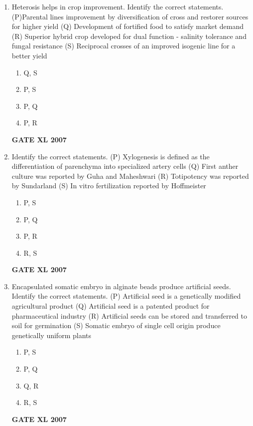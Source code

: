 \documentclass[journal,12pt,onecolumn]{IEEEtran}
\begin{document}
\begin{enumerate}
    \item Heterosis helps in crop improvement. Identify the correct statements.
		    (P)Parental lines improvement by diversification of cross and restorer sources for higher yield
		(Q) Development of fortified food to satisfy market demand
		(R) Superior hybrid crop developed for dual function - salinity tolerance and fungal resistance
		(S) Reciprocal crosses of an improved isogenic line for a better yield
    \begin{enumerate}
        \item Q, S
        \item P, S
        \item P, Q
        \item P, R
    \end{enumerate}\hfill{\textbf{GATE XL 2007}}

    \item Identify the correct statements.
		    (P) Xylogenesis is defined as the differentiation of parenchyma into specialized artery cells
		    (Q) First anther culture was reported by Guha and Maheshwari
		    (R) Totipotency was reported by Sundarland
		    (S) In vitro fertilization reported by Hoffmeister
    \begin{enumerate}
        \item P, S
        \item P, Q
        \item P, R
        \item R, S
    \end{enumerate}\hfill{\textbf{GATE XL 2007}}
    \item Encapsulated somatic embryo in alginate beads produce artificial seeds. Identify the correct statements.
		    (P) Artificial seed is a genetically modified agricultural product
		    (Q) Artificial seed is a patented product for pharmaceutical industry
		    (R) Artificial seeds can be stored and transferred to soil for germination
		    (S) Somatic embryo of single cell origin produce genetically uniform plants
    \begin{enumerate}
        \item P, S
        \item P, Q
        \item Q, R
        \item R, S
    \end{enumerate}\hfill{\textbf{GATE XL 2007}}


\end{enumerate}
\end{document}
